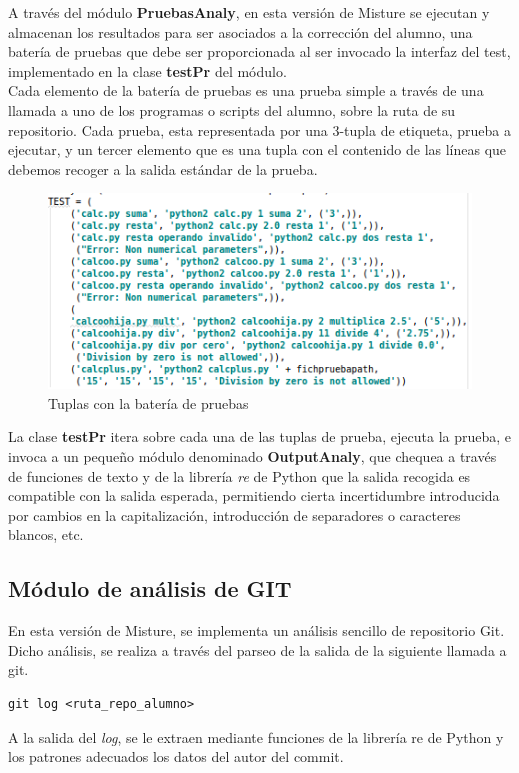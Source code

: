 A través del módulo \textbf{PruebasAnaly}, en esta versión de Misture se ejecutan y almacenan los resultados para ser asociados a la corrección del alumno, una batería de pruebas que debe ser proporcionada al ser invocado la interfaz del test, implementado en la clase \textbf{testPr} del módulo.\\

Cada elemento de la batería de pruebas es una prueba simple a través de una llamada a uno de los programas o scripts del alumno, sobre la ruta de su repositorio. Cada prueba, esta representada por una 3-tupla de etiqueta, prueba a ejecutar, y un tercer elemento que es una tupla con el contenido de las líneas que debemos recoger a la salida estándar de la prueba.


\begin{figure}[H]
   \centering
   \includegraphics[width=16cm]{img/Selection_024_testcodigo}
   \caption{Tuplas con la batería de pruebas}
   \label{figura:testcodigo}
\end{figure}

La clase \textbf{testPr} itera sobre cada una de las tuplas de prueba, ejecuta la prueba, e invoca a un pequeño módulo denominado \textbf{OutputAnaly}, que chequea a través de funciones de texto y de la librería \textit{re} de Python que la salida recogida es compatible con la salida esperada, permitiendo cierta incertidumbre introducida por cambios en la capitalización, introducción de separadores o caracteres blancos, etc.

\subsection{Módulo de análisis de GIT}


En esta versión de Misture, se implementa un análisis sencillo de repositorio Git. Dicho análisis, se realiza a través del parseo de la salida de la siguiente llamada a git.
\begin{center}
\begin{verbatim}
git log <ruta_repo_alumno>
\end{verbatim}
\end{center}
A la salida del \textit{log}, se le extraen mediante funciones de la librería re de Python y los patrones adecuados los datos del autor del commit.\\


